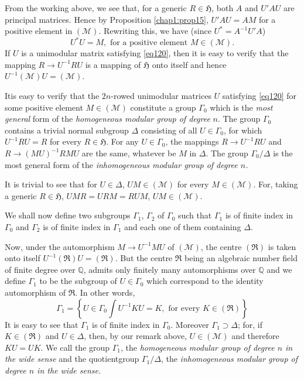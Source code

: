 From the working above, we see that, for a generic $R\in\mathfrak{H}$,
both $A$ and $U'AU$ are principal matrices. Hence by Proposition
\ref{chap1:prop15}, $U'AU=AM$ for a positive element in
$(\mathscr{M})$. Rewriting this, we have (since $U^{\ast}=A^{-1}U'A$)
\begin{equation*}
U^{\ast}U=M, \text{ \ for a positive element \ } M\in
(\mathscr{M}).\tag{120}\label{eq120} 
\end{equation*}
If $U$ is a unimodular matrix satisfying \eqref{eq120}, then it is easy
to verify that the mapping $R\to U^{-1}RU$ is a mapping of
$\mathfrak{H}$ onto itself and hence
$U^{-1}(\mathscr{M})U=(\mathscr{M})$. 

It\pageoriginale is easy to verify that the $2n$-rowed unimodular
matrices $U$ satisfying \eqref{eq120} for some positive element
$M\in(\mathscr{M})$ constitute a group $\Gamma_{0}$ which is the {\em
  most general} form of the {\em homogeneous modular group of degree}
$n$. The group $\Gamma_{0}$ contains a trivial normal subgroup
$\Delta$ consisting of all $U\in\Gamma_{0}$, for which $U^{-1}RU=R$
for every $R\in\mathfrak{H}$. For any $U\in\Gamma_{0}$, the mappings
$R\to U^{-1}RU$ and $R\to (MU)^{-1}RMU$ are the same, whatever be $M$
in $\Delta$. The group $\Gamma_{0}/\Delta$ is the most general form of
the {\em inhomogeneous modular group of degree $n$.}

It is trivial to see that for $U\in\Delta$, $UM\in(\mathscr{M})$ for
every $M\in(\mathscr{M})$. For, taking a generic $R\in\mathfrak{H}$,
$UMR=URM=RUM$, \ie $UM\in(\mathscr{M})$.

We shall now define two subgroups $\Gamma_{1}$, $\Gamma_{2}$ of
$\Gamma_{0}$ such that $\Gamma_{1}$ is of finite index in $\Gamma_{0}$
and $\Gamma_{2}$ is of finite index in $\Gamma_{1}$ and each one of
them containing $\Delta$.

Now, under the automorphism $M\to U^{-1}MU$ of $(\mathscr{M})$, the
centre $(\mathfrak{R})$ is taken onto itself \ie
$U^{-1}(\mathfrak{R})U=(\mathfrak{R})$. But the centre
$\mathfrak{R}$ being an algebraic number field of finite degree over
$\mathbb{Q}$, admits only finitely many automorphisms over
$\mathbb{Q}$ and we define $\Gamma_{1}$ to be the subgroup of
$U\in\Gamma_{0}$ which correspond to the identity automorphism of
$\mathfrak{R}$. In other words,
$$
\Gamma_{1}=\left\{U\in\Gamma_{0}\int U^{-1}KU=K,\text{ \ for every \ }
K\in (\mathfrak{R})\right\}
$$
It is easy to see that $\Gamma_{1}$ is of finite index in
$\Gamma_{0}$. Moreover $\Gamma_{1}\supset \Delta$; for, if
$K\in(\mathfrak{R})$ and $U\in\Delta$, then, by our remark above,
$U\in(\mathscr{M})$ and therefore $KU=UK$. We call the group
$\Gamma_{1}$, the {\em homogeneous modular group of degree $n$ in the
  wide sense} and the quotient\pageoriginale group
$\Gamma_{1}/\Delta$, the {\em inhomogeneous modular group of degree
  $n$ in the wide sense.}

